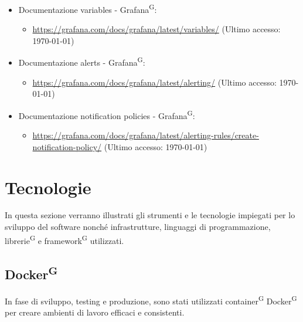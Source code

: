 \documentclass[8pt]{article}
\newcommand{\glossterm}[1]{#1\textsuperscript{G}} %
\begin{document}
\begin{itemize}
\begin{itemize}
	\end{itemize}
    \item Documentazione variables - \glossterm{Grafana}:
    \begin{itemize}
	\setlength\itemsep{0em}
		\item \href{https://grafana.com/docs/grafana/latest/variables/}{\color{myblue}https://grafana.com/docs/grafana/latest/variables/} (Ultimo accesso: \today)
	\end{itemize}
    \item Documentazione alerts - \glossterm{Grafana}:
    \begin{itemize}
	\setlength\itemsep{0em}
		\item \href{https://grafana.com/docs/grafana/latest/alerting/}{\color{myblue}https://grafana.com/docs/grafana/latest/alerting/} (Ultimo accesso: \today)
	\end{itemize}
    \item Documentazione notification policies - \glossterm{Grafana}:
    \begin{itemize}
	\setlength\itemsep{0em}
		\item \href{https://grafana.com/docs/grafana/latest/alerting-rules/create-notification-policy/}{\color{myblue}https://grafana.com/docs/grafana/latest/alerting-rules/create-notification-policy/} (Ultimo accesso: \today)
	\end{itemize}
\end{itemize}
\newpage
\clearpage
\section{Tecnologie}\label{sec:tec}
In questa sezione verranno illustrati gli strumenti e le tecnologie impiegati per lo sviluppo del software nonché infrastrutture, linguaggi di programmazione, \glossterm{librerie} e \glossterm{framework} utilizzati.
\subsection{\glossterm{Docker}}
In fase di sviluppo, testing e produzione, sono stati utilizzati \glossterm{container} \glossterm{Docker} per creare ambienti di lavoro efficaci e consistenti.
\end{document}
